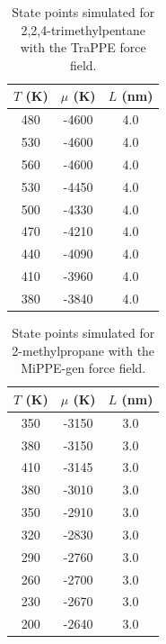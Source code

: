 \documentclass[journal=jctc,manuscript=article]{achemso}
\begin{document}
\begin{table}[htb!]
	\caption{State points simulated for 2,2,4-trimethylpentane with the TraPPE force field.}
	\begin{center}
		\begin{tabular}{|c|c|c|}
			\hline
			$T$ (K) & $\mu$ (K) & $L$ (nm) \\ \hline
			480	&	-4600	&	4.0	\\
			530	&	-4600	&	4.0	\\
			560	&	-4600	&	4.0	\\
			530	&	-4450	&	4.0	\\
			500	&	-4330	&	4.0	\\
			470	&	-4210	&	4.0	\\
			440	&	-4090	&	4.0	\\
			410	&	-3960	&	4.0	\\
			380	&	-3840	&	4.0	\\
			\hline
		\end{tabular}
	\end{center}
\end{table}

\begin{table}[htb!]
	\caption{State points simulated for 2-methylpropane with the MiPPE-gen force field.}
	\begin{center}
		\begin{tabular}{|c|c|c|}
			\hline
			$T$ (K) & $\mu$ (K) & $L$ (nm) \\ \hline
			350	&	-3150	&	3.0	\\
			380	&	-3150	&	3.0	\\
			410	&	-3145	&	3.0	\\
			380	&	-3010	&	3.0	\\
			350	&	-2910	&	3.0	\\
			320	&	-2830	&	3.0	\\
			290	&	-2760	&	3.0	\\
			260	&	-2700	&	3.0	\\
			230	&	-2670	&	3.0	\\
			200	&	-2640	&	3.0	\\
			\hline
		\end{tabular}
	\end{center}
\end{table}
\end{document}

